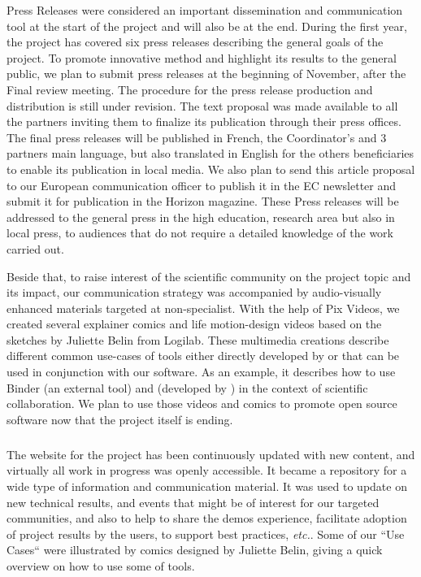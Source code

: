  Press Releases were considered an important dissemination and communication tool at the start of the project and will also be at the end. During the  first year, the project has covered six press releases describing the general goals of the project. To promote \ODK innovative method and highlight its results to the general public, we plan to submit press releases at the beginning of November, after the Final review meeting. The procedure for the press release production and distribution is still under revision. The text proposal was made available to all the partners  inviting them to finalize its publication through their press offices. The final press releases will be published in French, the Coordinator’s and 3 partners main language, but also translated in English for the others beneficiaries to enable its publication in local media. We also plan to send this article proposal to our European communication officer to publish it in the EC newsletter and submit it for publication in the Horizon magazine.  These Press releases will  be  addressed  to   the general press in the high education, research area but also in local press, to audiences that do not require a detailed knowledge of the work carried out.

 Beside that, to raise interest of the scientific community on the project topic and its impact, our communication strategy was accompanied by audio-visually enhanced materials targeted at non-specialist. With the help of Pix Videos, we created several explainer comics and life motion-design videos based on the sketches by Juliette Belin from Logilab. These multimedia creations describe different common use-cases of tools either directly developed by \ODK or that can be used in conjunction with our software. As an example, it describes how to use Binder (an external tool) and \Jupyter (developed by \ODK) in the context of scientific collaboration. We plan to use those videos and comics to promote open source software now that the project itself is ending.



\subparagraph{}


The website for the project has been continuously updated with new content, and virtually all work in progress was openly accessible. It  became  a  repository  for  a  wide  type  of information and communication material. It was used to update on new technical results, and events that might be of interest for our targeted communities, and also to help to share the demos experience, facilitate adoption of project results by the users, to support best practices, \emph{etc.}.
Some of our ``Use Cases`` were illustrated by comics designed by
Juliette Belin, giving a quick overview on how to use some of \ODK
tools.

